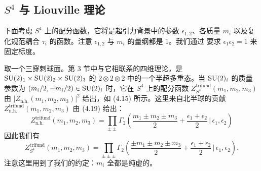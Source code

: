 

\subsection{$S^4$ 与 Liouville 理论}

下面考虑 $S^4$ 上的配分函数，它将是超引力背景中的参数 $\epsilon_{1,2}$、各质量 $m_i$
以及复化规范耦合 $\tau_i$ 的函数。注意 $\epsilon_{1,2}$ 与 $m_i$ 的量纲都是 1。我们通过
要求 $\epsilon_1\epsilon_2=1$ 来固定标度。

取一个三穿刺球面。第 3 节中与它相联系的四维理论，是
$\mathrm{SU}(2)_1\times\mathrm{SU}(2)_2\times\mathrm{SU}(2)_3$ 的 $2\otimes2\otimes2$ 中的一个半超多重态。当
$\mathrm{SU}(2)_i$ 的质量参数为 $(m_i/2,-m_i/2)\in\mathrm{SU}(2)_i$ 时，它在 $S^4$ 上的配分函数
$Z^{\text{trifund}}_{S^4}(m_1,m_2,m_3)$ 由 $|Z_{\text{n.h.}}(m_1,m_2,m_3)|^2$ 给出，如 (4.15)
所示。这里来自北半球的贡献 $Z^{\text{trifund}}_{\text{n.h.}}(m_1,m_2,m_3)$ 由 (4.19) 给出：
\begin{equation}
Z^{\text{trifund}}_{\text{n.h.}}(m_1,m_2,m_3)=\prod_{\pm\pm}
\Gamma_2\left(\frac{m_1\pm m_2\pm m_3}{2}+\frac{\epsilon_1+\epsilon_2}{2}\,\Big|
\,\epsilon_1,\epsilon_2\right)
\tag{5.13}
\end{equation}
因此我们有
\begin{equation}
Z^{\text{trifund}}_{S^4}(m_1,m_2,m_3)=\prod_{\pm\pm\pm}
\Gamma_2\left(\frac{\pm m_1\pm m_2\pm m_3}{2}+\frac{\epsilon_1+\epsilon_2}{2}\,\Big|
\,\epsilon_1,\epsilon_2\right).
\tag{5.14}
\end{equation}
注意这里用到了我们的约定：$m_i$ 全都是纯虚的。


